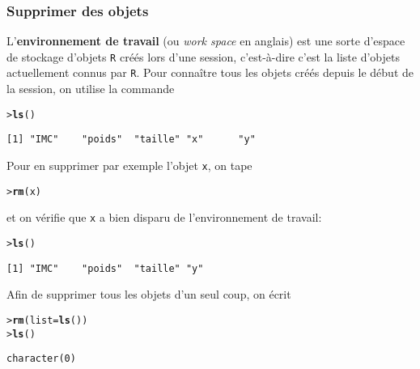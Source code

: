 \documentclass[11pt]{article}
\makeatletter
\numberwithin{equation}{section}
\theoremstyle{remark}
\newenvironment{kframe}{%
 \def\at@end@of@kframe{}%
 \ifinner\ifhmode%
  \def\at@end@of@kframe{\end{minipage}}%
  \begin{minipage}{\columnwidth}%
 \fi\fi%
 \def\FrameCommand##1{\hskip\@totalleftmargin \hskip-\fboxsep
 \colorbox{shadecolor}{##1}\hskip-\fboxsep
     \hskip-\linewidth \hskip-\@totalleftmargin \hskip\columnwidth}%
 \MakeFramed {\advance\hsize-\width
   \@totalleftmargin\z@ \linewidth\hsize
   \@setminipage}}%
 {\par\unskip\endMakeFramed%
 \at@end@of@kframe}
\newenvironment{knitrout}{}{}
\newcommand{\hlstd}[1]{\textcolor[rgb]{0,0.2,0.4}{#1}}%
\newcommand{\hlkwc}[1]{\textcolor[rgb]{0.43,0.21,0.1}{#1}}%
\newcommand{\hlkwd}[1]{\textcolor[rgb]{0.76,0.13,0.28}{\textbf{#1}}}%
\makeatother
\begin{document}
\subsubsection{Supprimer des objets}
L'{\bf environnement de travail} (ou {\it work space} en anglais) est une sorte d'espace de stockage d'objets \texttt{R} créés lors d'une session, c'est-à-dire c'est   la liste d'objets actuellement connus par \texttt{R}.
Pour connaître tous les objets créés depuis le début de la session, on utilise la commande
\begin{knitrout}
\color{fgcolor}\begin{kframe}
\begin{alltt}
\hlstd{> }\hlkwd{ls}\hlstd{()}
\end{alltt}
\begin{verbatim}
[1] "IMC"    "poids"  "taille" "x"      "y"     
\end{verbatim}
\end{kframe}
\end{knitrout}
Pour en supprimer par exemple l'objet \texttt{x}, on tape
\begin{knitrout}
\color{fgcolor}\begin{kframe}
\begin{alltt}
\hlstd{> }\hlkwd{rm}\hlstd{(x)}
\end{alltt}
\end{kframe}
\end{knitrout}
et on vérifie que \texttt{x} a bien disparu de l'environnement de travail:
\begin{knitrout}
\color{fgcolor}\begin{kframe}
\begin{alltt}
\hlstd{> }\hlkwd{ls}\hlstd{()}
\end{alltt}
\begin{verbatim}
[1] "IMC"    "poids"  "taille" "y"     
\end{verbatim}
\end{kframe}
\end{knitrout}
Afin de supprimer tous les objets d'un seul coup, on écrit
\begin{knitrout}
\color{fgcolor}\begin{kframe}
\begin{alltt}
\hlstd{> }\hlkwd{rm}\hlstd{(}\hlkwc{list}\hlstd{=}\hlkwd{ls}\hlstd{())}
\hlstd{> }\hlkwd{ls}\hlstd{()}
\end{alltt}
\begin{verbatim}
character(0)
\end{verbatim}
\end{kframe}
\end{knitrout}
\end{document}
